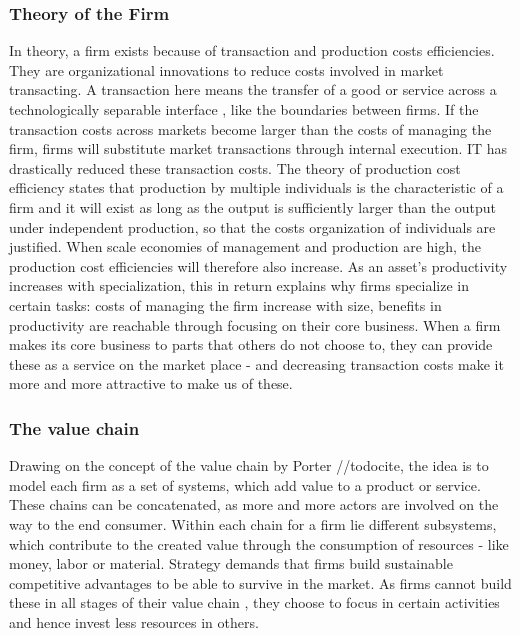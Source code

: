 		\subsubsection{Theory of the Firm}
		In theory, a firm exists because of transaction and production costs efficiencies. They are organizational innovations to reduce costs involved in market transacting. A transaction here means the transfer of a good or service across a technologically separable interface \cite{williamson1981economics, williamson1971vertical}, like the boundaries between firms. If the transaction costs across markets become larger than the costs of managing the firm, firms will substitute market transactions through internal execution. IT has drastically reduced these transaction costs.
		The theory of production cost efficiency states that production by multiple individuals is the characteristic of a firm \cite{alchian1972production} and it will exist as long as the output is sufficiently larger than the output under independent production, so that the costs organization of individuals are justified. When scale economies of management and production are high, the production cost efficiencies will therefore also increase. As an asset's productivity increases with specialization, this in return explains why firms specialize in certain tasks: costs of managing the firm increase with size,  benefits in productivity are reachable through focusing on their core business.
		When a firm makes its core business to parts that others do not choose to, they can provide these as a service on the market place - and decreasing transaction costs make it more and more attractive to make us of these. 
		
		\subsubsection{The value chain}
		Drawing on the concept of the value chain by Porter //todocite, the idea is to model each firm as a set of systems, which add value to a product or service. These chains can be concatenated, as more and more actors are involved on the way to the end consumer. Within each chain for a firm lie different subsystems, which contribute to the created value through the consumption of resources - like money, labor or material. Strategy demands that firms build sustainable competitive advantages to be able to survive in the market. As firms cannot build these in all stages of their value chain \cite{Ramachandran2004}, they choose to focus in certain activities and hence invest less resources in others. 
		
